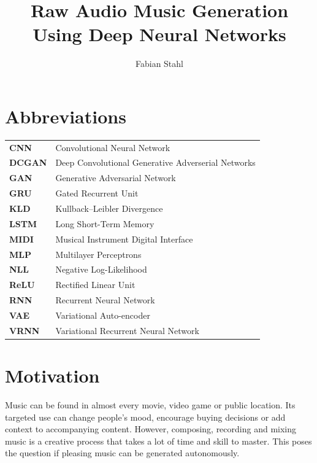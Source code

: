 \documentclass[12pt]{article}
\begin{document}
\setlength\parindent{0pt}
\title{Raw Audio Music Generation Using Deep Neural Networks}
\author{Fabian Stahl}


\maketitle

\tableofcontents

\newpage
\section*{Abbreviations}
\begin{center}
\begin{tabular}{l l}
\textbf{CNN} & Convolutional Neural Network \\
\textbf{DCGAN} & Deep Convolutional Generative Adverserial Networks\\
\textbf{GAN} & Generative Adversarial Network \\
\textbf{GRU} & Gated Recurrent Unit \\
\textbf{KLD}  & Kullback–Leibler Divergence\\
\textbf{LSTM} & Long Short-Term Memory \\
\textbf{MIDI} & Musical Instrument Digital Interface \\
\textbf{MLP} & Multilayer Perceptrons \\
\textbf{NLL} & Negative Log-Likelihood \\
\textbf{ReLU} & Rectified Linear Unit \\
\textbf{RNN} & Recurrent Neural Network \\
\textbf{VAE} & Variational Auto-encoder \\
\textbf{VRNN} & Variational Recurrent Neural Network \\
\end{tabular}
\end{center}
\newpage


\section{Motivation}
Music can be found in almost every movie, video game or public location.
Its targeted use can change people's mood, encourage buying decisions or add context to accompanying content.
However, composing, recording and mixing music is a creative process that takes a lot of time and skill to master.
This poses the question if pleasing music can be generated autonomously.
\end{document}
